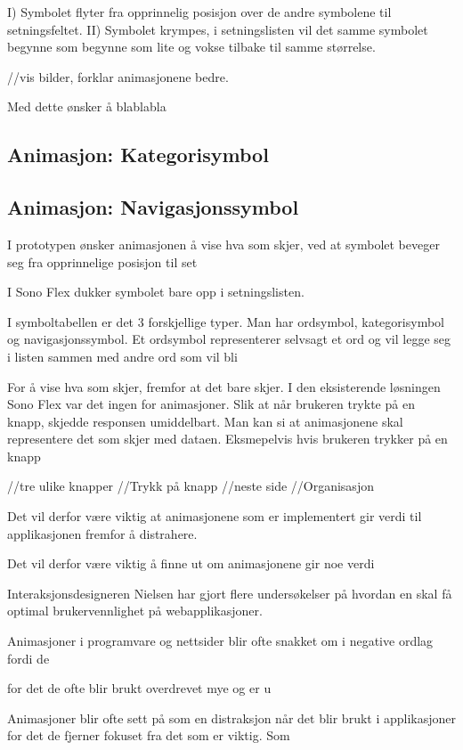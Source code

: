 \documentclass[phd,tocprelim]{cornell}
\begin{document}
I) Symbolet flyter fra opprinnelig posisjon over de andre symbolene til setningsfeltet. 
II) Symbolet krympes,  i setningslisten vil det samme symbolet begynne som begynne som lite og vokse tilbake til samme størrelse. 

//vis bilder,  forklar animasjonene bedre. 

Med dette ønsker å blablabla

\subsection{Animasjon: Kategorisymbol}

\subsection{Animasjon: Navigasjonssymbol}


I prototypen ønsker animasjonen å vise hva som skjer,  ved at symbolet beveger seg fra opprinnelige posisjon til set

I Sono Flex dukker symbolet bare opp i setningslisten.

I symboltabellen er det 3 forskjellige typer. Man har 
ordsymbol, kategorisymbol og navigasjonssymbol. Et ordsymbol representerer selvsagt et ord og vil legge seg i listen sammen med andre ord som vil bli 

For å vise hva som skjer, fremfor at det bare skjer. I den eksisterende løsningen Sono Flex var det ingen for animasjoner. Slik at når brukeren trykte på en knapp, skjedde responsen umiddelbart. Man kan si at animasjonene skal representere det som skjer med dataen. Eksmepelvis hvis brukeren trykker på en knapp 


//tre ulike knapper
    //Trykk på knapp
    //neste side
    //Organisasjon



Det vil derfor være viktig at animasjonene som er implementert gir verdi til applikasjonen fremfor å distrahere.

Det vil derfor være viktig å finne ut om animasjonene gir noe verdi 

Interaksjonsdesigneren Nielsen har gjort flere undersøkelser på hvordan en skal få optimal brukervennlighet på webapplikasjoner. 

Animasjoner i programvare og nettsider blir ofte snakket om i negative ordlag fordi de

for det de ofte blir brukt overdrevet mye og er u

Animasjoner blir ofte sett på som en distraksjon når det blir brukt i applikasjoner for det de fjerner fokuset fra det som er viktig. Som 
\end{document}
